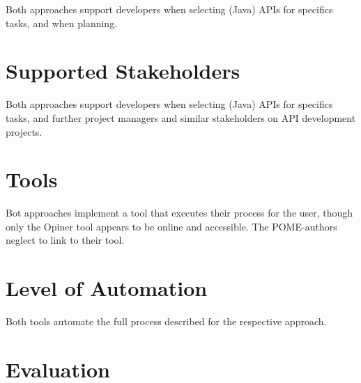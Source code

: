 \documentclass[a4paper,10pt, bibliography=totocnumbered]{scrreprt}
\begin{document}
Both approaches support developers when selecting (Java) APIs for specifics tasks, and when planning.

\section{Supported Stakeholders}

Both approaches support developers when selecting (Java) APIs for specifics tasks, and further project managers and similar stakeholders on API development projects.

\section{Tools}

Bot approaches implement a tool that executes their process for the user, though only the Opiner tool appears to be online and accessible. The POME-authors neglect to link to their tool.

\section{Level of Automation}

Both tools automate the full process described for the respective approach.

\section{Evaluation}
\end{document}
